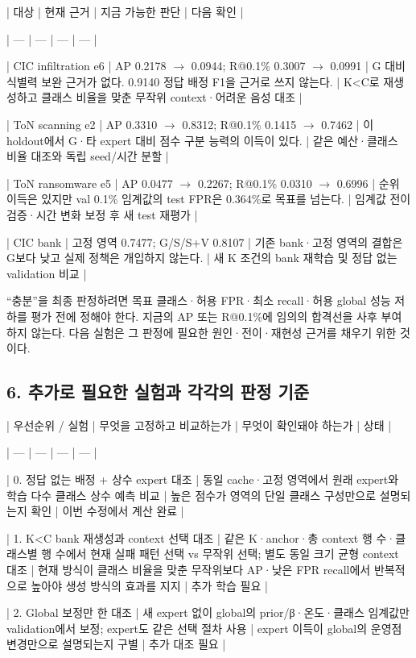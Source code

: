 | 대상 | 현재 근거 | 지금 가능한 판단 | 다음 확인 |

| --- | --- | --- | --- |

| CIC infiltration e6 | AP 0.2178 \ensuremath{\rightarrow} 0.0944; R@0.1\% 0.3007 \ensuremath{\rightarrow} 0.0991 | G 대비 식별력 보완 근거가 없다. 0.9140 정답 배정 F1을 근거로 쓰지 않는다. | K<C로 재생성하고 클래스 비율을 맞춘 무작위 context·어려운 음성 대조 |

| ToN scanning e2 | AP 0.3310 \ensuremath{\rightarrow} 0.8312; R@0.1\% 0.1415 \ensuremath{\rightarrow} 0.7462 | 이 holdout에서 G·타 expert 대비 점수 구분 능력의 이득이 있다. | 같은 예산·클래스 비율 대조와 독립 seed/\allowbreak{}시간 분할 |

| ToN ransomware e5 | AP 0.0477 \ensuremath{\rightarrow} 0.2267; R@0.1\% 0.0310 \ensuremath{\rightarrow} 0.6996 | 순위 이득은 있지만 val 0.1\% 임계값의 test FPR은 0.364\%로 목표를 넘는다. | 임계값 전이 검증·시간 변화 보정 후 새 test 재평가 |

| CIC bank | 고정 영역 0.7477; G/\allowbreak{}S/\allowbreak{}S+\allowbreak{}V 0.8107 | 기존 bank·고정 영역의 결합은 G보다 낮고 실제 정책은 개입하지 않는다. | 새 K 조건의 bank 재학습 및 정답 없는 validation 비교 |

“충분”을 최종 판정하려면 목표 클래스·허용 FPR·최소 recall·허용 global 성능 저하를 평가 전에 정해야 한다. 지금의 AP 또는 R@0.1\%에 임의의 합격선을 사후 부여하지 않는다. 다음 실험은 그 판정에 필요한 원인·전이·재현성 근거를 채우기 위한 것이다.

\subsection{6. 추가로 필요한 실험과 각각의 판정 기준}
| 우선순위 /\allowbreak{} 실험 | 무엇을 고정하고 비교하는가 | 무엇이 확인돼야 하는가 | 상태 |

| --- | --- | --- | --- |

| 0. 정답 없는 배정 +\allowbreak{} 상수 expert 대조 | 동일 cache·고정 영역에서 원래 expert와 학습 다수 클래스 상수 예측 비교 | 높은 점수가 영역의 단일 클래스 구성만으로 설명되는지 확인 | 이번 수정에서 계산 완료 |

| 1. K<C bank 재생성과 context 선택 대조 | 같은 K·anchor·총 context 행 수·클래스별 행 수에서 현재 실패 패턴 선택 vs 무작위 선택; 별도 동일 크기 균형 context 대조 | 현재 방식이 클래스 비율을 맞춘 무작위보다 AP·낮은 FPR recall에서 반복적으로 높아야 생성 방식의 효과를 지지 | 추가 학습 필요 |

| 2. Global 보정만 한 대조 | 새 expert 없이 global의 prior/\allowbreak{}β·온도·클래스 임계값만 validation에서 보정; expert도 같은 선택 절차 사용 | expert 이득이 global의 운영점 변경만으로 설명되는지 구별 | 추가 대조 필요 |

